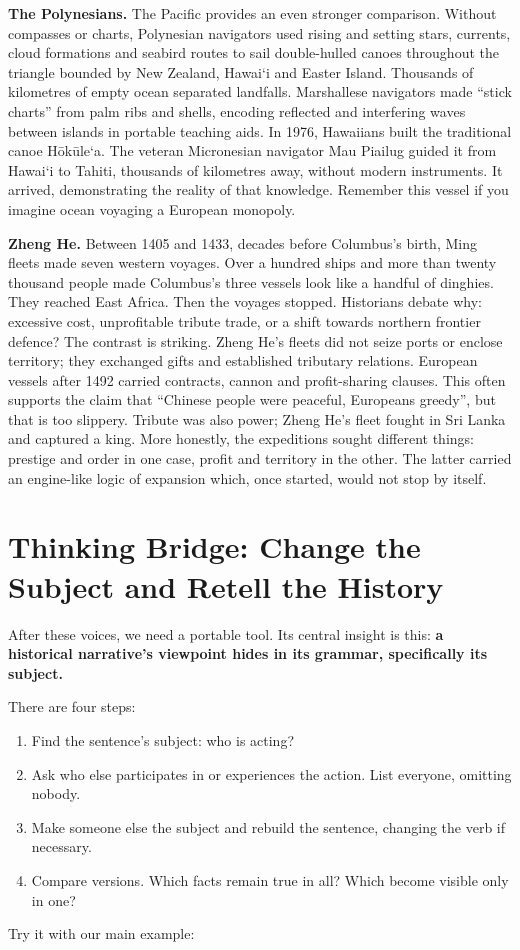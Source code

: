 \textbf{The Polynesians.} The Pacific provides an even stronger comparison. Without compasses or charts, Polynesian navigators used rising and setting stars, currents, cloud formations and seabird routes to sail double-hulled canoes throughout the triangle bounded by New Zealand, Hawai‘i and Easter Island. Thousands of kilometres of empty ocean separated landfalls. Marshallese navigators made ``stick charts'' from palm ribs and shells, encoding reflected and interfering waves between islands in portable teaching aids. In 1976, Hawaiians built the traditional canoe Hōkūle‘a. The veteran Micronesian navigator Mau Piailug guided it from Hawai‘i to Tahiti, thousands of kilometres away, without modern instruments. It arrived, demonstrating the reality of that knowledge. Remember this vessel if you imagine ocean voyaging a European monopoly.

\textbf{Zheng He.} Between 1405 and 1433, decades before Columbus's birth, Ming fleets made seven western voyages. Over a hundred ships and more than twenty thousand people made Columbus's three vessels look like a handful of dinghies. They reached East Africa. Then the voyages stopped. Historians debate why: excessive cost, unprofitable tribute trade, or a shift towards northern frontier defence? The contrast is striking. Zheng He's fleets did not seize ports or enclose territory; they exchanged gifts and established tributary relations. European vessels after 1492 carried contracts, cannon and profit-sharing clauses. This often supports the claim that ``Chinese people were peaceful, Europeans greedy'', but that is too slippery. Tribute was also power; Zheng He's fleet fought in Sri Lanka and captured a king. More honestly, the expeditions sought different things: prestige and order in one case, profit and territory in the other. The latter carried an engine-like logic of expansion which, once started, would not stop by itself.

\section[Thinking Bridge: Change the Subject]{Thinking Bridge: Change the Subject and Retell the History}
After these voices, we need a portable tool. Its central insight is this: \textbf{a historical narrative's viewpoint hides in its grammar, specifically its subject.}

There are four steps:

\begin{enumerate}
\item Find the sentence's subject: who is acting?
\item Ask who else participates in or experiences the action. List everyone, omitting nobody.
\item Make someone else the subject and rebuild the sentence, changing the verb if necessary.
\item Compare versions. Which facts remain true in all? Which become visible only in one?
\end{enumerate}
Try it with our main example:

